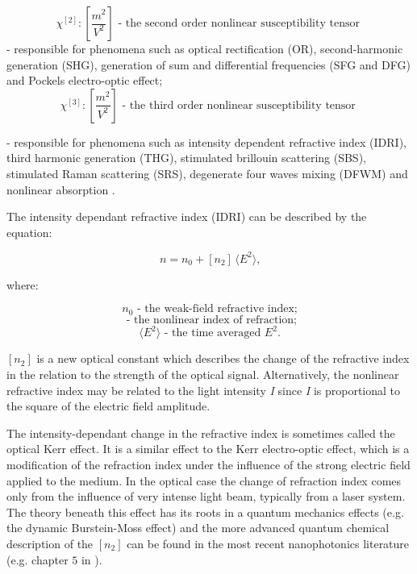 \documentclass[12pt,twoside,a4paper]{article}
\numberwithin{equation}{subsection}
\numberwithin{figure}{subsection}
\begin{document}
\begin{equation*}
  \chi ^{[2]} : [\frac {m^{2}}{V^{2}}]
  \mbox{ - the second order nonlinear susceptibility tensor  }
\end{equation*}
- responsible for phenomena such as optical rectification (OR), second-harmonic generation (SHG), generation of sum and
differential frequencies (SFG and DFG) and Pockels electro-optic effect;
\begin{equation*}
  \chi ^{[3]} : [\frac {m^{2}}{V^{2}}]
  \mbox{ - the third order nonlinear susceptibility tensor  }
\end{equation*}

- responsible for phenomena such as intensity dependent refractive index (IDRI), third harmonic generation (THG), stimulated
brillouin scattering (SBS), stimulated Raman scattering (SRS), degenerate four waves mixing (DFWM)
and nonlinear absorption \cite{samoc_nlo_opt_mat}. 

The intensity dependant refractive index (IDRI) can be described by the equation:

\begin{equation} \label{eq:refr_idri}
  n={n_{0}} + [{n_{2}}]\,\langle E^{2}\rangle \mbox{,}
\end{equation}

where: 

\begin{equation*}
  {n_{0}} \mbox{ - the weak-field refractive index;}
\end{equation*}
\begin{equation*}
  [{n_{2}}] \mbox{ - the nonlinear index of refraction;}
\end{equation*}
\begin{equation*}
  \langle E^{2}\rangle \mbox{ - the time averaged $E^2$.}
\end{equation*}

$[n_2]$ is a new optical constant which describes the change of the refractive index in the relation to the strength of
the optical signal. Alternatively, the nonlinear refractive index may be related to the light intensity \textit{I} since \textit{I} is
proportional to the square of the electric field amplitude.

The intensity-dependant change in the refractive index is sometimes called the optical Kerr effect. It is a similar effect to
the Kerr electro-optic effect, which is a modification of the refraction index under the influence of the strong electric field
applied to the medium. In the optical case the change of refraction index comes only from the influence of very intense light beam,
typically from a laser system. The theory beneath this effect has its roots in a quantum mechanics effects (e.g. the dynamic
Burstein-Moss effect) and the more advanced quantum chemical description of the $[n_2]$ can be found in the most recent
nanophotonics literature (e.g. chapter $5$ in \cite{christodoulides_nonlinear}).
\end{document}
